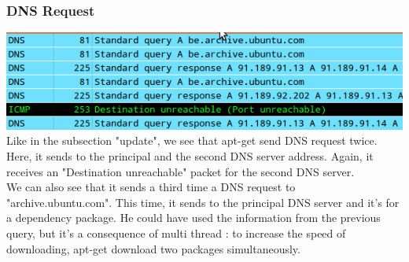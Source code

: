 \documentclass[twoside]{article}
\begin{document}
\begin{multicols}{2}
\subsubsection{DNS Request}
\includegraphics[scale=0.4]{pictures/install_dns.png}
Like in the subsection "update", we see that apt-get send DNS request twice.  Here, it sends to the principal and the second DNS server address.  Again, it receives an "Destination unreachable" packet for the second DNS server.\\
We can also see that it sends a third time a DNS request to "archive.ubuntu.com".  This time, it sends to the principal DNS server and it's for a dependency package.  He could have used the information from the previous query, but it's a consequence of multi thread : to increase the speed of downloading, apt-get download two packages simultaneously.\\

\end{multicols}
\end{document}
